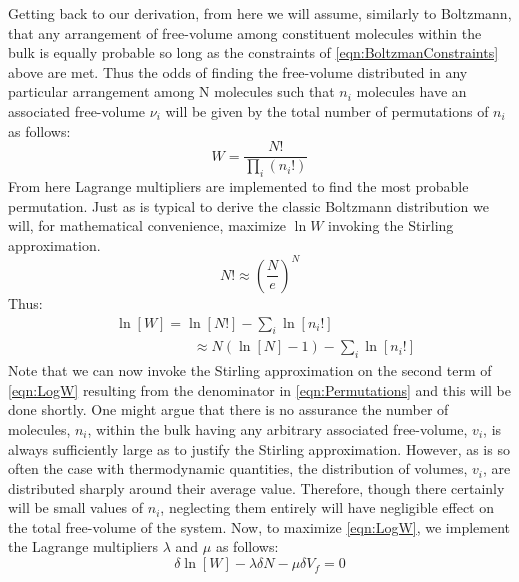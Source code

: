 Getting back to our derivation, from  here we will assume, similarly to Boltzmann, that any arrangement of free-volume among constituent molecules within the bulk is equally probable so long as the constraints of \eqn\nolinebreak \ref{eqn:BoltzmanConstraints} above are met.  Thus the odds of finding the free-volume distributed in any particular arrangement among N molecules such that $n_i$ molecules have an associated free-volume $\nu_i$ will be given by the total number of permutations of $n_i$ as follows:
\begin{equation}
	W=\frac{N!}{\prod_{i}\left(n_i! \right )}
	\label{eqn:Permutations}
\end{equation}
From here Lagrange multipliers are implemented to find the most probable permutation.  Just as is typical to derive the classic Boltzmann distribution we will, for mathematical convenience, maximize $\ln W$ invoking the Stirling approximation.
\begin{equation}
	N!\approx\left(\frac{N}{e}\right)^N
\end{equation}
Thus:
\begin{equation}
	\begin{split}
		&\ln\left[W \right ]=\ln\left[N! \right ]-\sum_{i}\ln\left[n_i! \right ]\\
		&\;\;\;\;\;\;\;\;\;\;\;\;\;\;\;\;\;\;\;\;\approx N\left(\ln\left[N \right ]-1 \right )-\sum_{i}\ln\left[n_i! \right ]
	\end{split}
	\label{eqn:LogW}
\end{equation}
Note that we can now invoke the Stirling approximation on the second term of \eqn\nolinebreak \ref{eqn:LogW} resulting from the denominator in \eqn\nolinebreak \ref{eqn:Permutations} and this will be done shortly.  One might argue that there is no assurance the number of molecules, $n_i$, within the bulk having any arbitrary associated free-volume, $v_i$, is always sufficiently large as to justify the Stirling approximation.  However, as is so often the case with thermodynamic quantities, the distribution of volumes, $v_i$, are distributed sharply around their average value.  Therefore, though there certainly will be small values of $n_i$, neglecting them entirely will have negligible effect on the total free-volume of the system.  Now, to maximize \eqn\nolinebreak \ref{eqn:LogW}, we implement the Lagrange multipliers $\lambda$ and $\mu$ as follows:
\begin{equation}
	\delta\ln\left[W \right ]-\lambda\delta N-\mu\delta V_f=0
	\label{eqn:Lagrange}
\end{equation}
